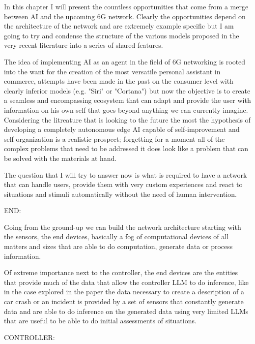 

In this chapter I will present the countless opportunities that come from a merge between AI and the
upcoming 6G network. Clearly the opportunities depend on the architecture of the network and are
extremely example specific but I am going to try and condense the structure of the various models
proposed in the very recent literature into a series of shared features.

The idea of implementing AI as an agent in the field of 6G networking is rooted into the want for
the creation of the most versatile personal assistant in commerce, attempts have been made in the
past on the consumer level with clearly inferior models (e.g. "Siri" or "Cortana") but now the
objective is to create a seamless and encompassing ecosystem that can adapt and provide the user
with information on his own self that goes beyond anything we can currently imagine. Considering the
litreature that is looking to the future the most the hypothesis of developing a completely
autonomous edge AI capable of self-improvement and self-organization \cite{ai4ci} is a realistic
prospect; forgetting for a moment all of the complex problems that need to be addressed it does look
like a problem that can be solved with the materials at hand.

The question that I will try to answer now is what is required to have a network that can handle
users, provide them with very custom experiences and react to situations and stimuli automatically
without the need of human intervention.

\bigskip
\noindent
END:
\label{ssec:end}

Going from the ground-up we can build the network architecture starting with the sensors, the end
devices, basically a fog of computational devices of all matters and sizes that are able to do
computation, generate data or process information.

Of extreme importance next to the controller, the end devices are the entities that provide much of
the data that allow the controller LLM to do inference, like in the case explored in the \cite{pga}
paper the data necessary to create a description of a car crash or an incident is provided by a set
of sensors that constantly generate data and are able to do inference on the generated data using
very limited LLMs that are useful to be able to do initial assessments of situations.

\bigskip
\noindent
CONTROLLER:
\label{ssec:controller}

